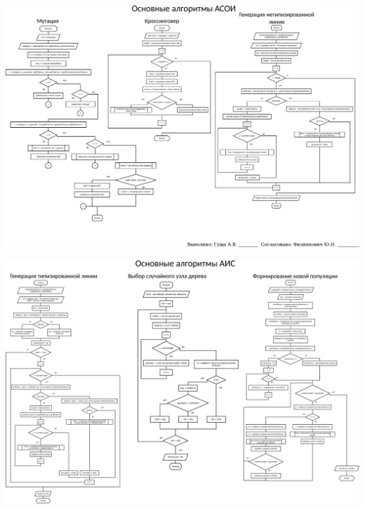 \documentclass[russian,utf8, a1paper]{eskdgraph}
\begin{document}
\begin{ESKDdrawing}
\includegraphics[scale=1.0]{list4}
\end{ESKDdrawing}

\begin{ESKDdrawing}
\includegraphics[scale=1.0]{list5}
\end{ESKDdrawing}
\end{document}
